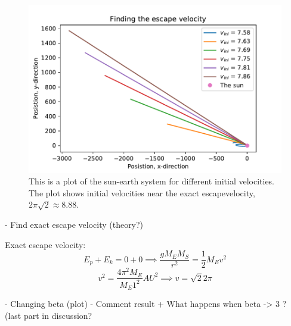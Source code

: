 \begin{figure}[H]
\includegraphics[width=1.1\linewidth]{../results/plots/escape_velocity_closeto_exact.pdf}\caption{This is a plot of the sun-earth system for different initial velocities. The plot shows initial velocities near the exact escapevelocity, $2\pi\sqrt{2} \approx 8.88 $. }\label{fig:escape_velocity_near_exact}
\end{figure}

	- Find exact escape velocity (theory?)

Exact escape velocity:
$$ E_p + E_k = 0 + 0 \implies \frac{g M_E M_S}{r^2} =\frac{1}{2}M_Ev^2$$
$$ v^2 = \frac{4 \pi^2 M_E}{M_E  1^2} AU^2 \implies v = \sqrt{2}2\pi$$

	- Changing beta (plot)
		- Comment result + What happens when beta -> 3 ? (last part in discussion?

